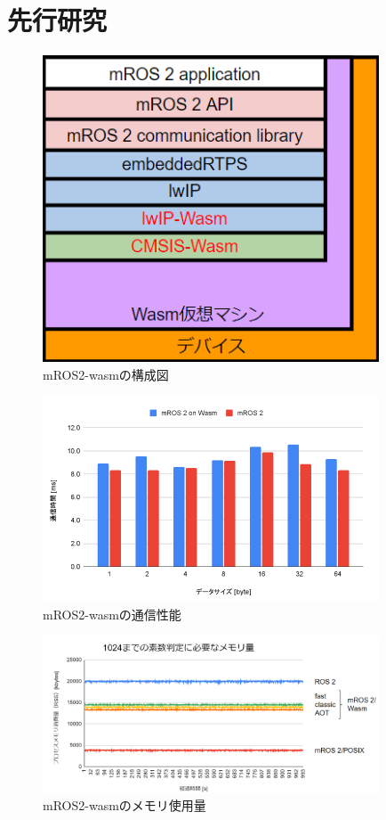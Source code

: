 \chapter{先行研究}
\begin{figure}[ht]
    \centering
    \includegraphics[width=10cm]{images/fig3_mros2-wasm_configuration.png}
    \caption{mROS2-wasmの構成図}
    \label{fig:mros2-wasm_configuration}
\end{figure}
\begin{figure}[ht]
    \centering
    \includegraphics[width=10cm]{images/fig3_kakimoto_pubsubtime.png}
    \caption{mROS2-wasmの通信性能}
    \label{fig:mros2-wasm_configuration}
\end{figure}
\begin{figure}[ht]
    \centering
    \includegraphics[width=10cm]{images/fig3_mros2-wasm_memory.png}
    \caption{mROS2-wasmのメモリ使用量}
    \label{fig:mros2-wasm_configuration}
\end{figure}
